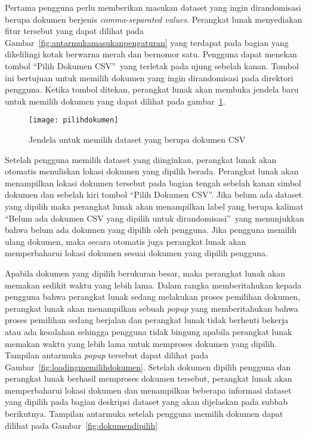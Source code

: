 Pertama pengguna perlu memberikan masukan dataset yang ingin dirandomisasi berupa dokumen berjenis \textit{comma-separated values}. Perangkat lunak menyediakan fitur tersebut yang dapat dilihat pada Gambar~\ref{fig:antarmukamasukanpengaturan} yang terdapat pada bagian yang dikelilingi kotak berwarna merah dan bernomor satu. Pengguna dapat menekan tombol \textquotedblleft Pilih Dokumen CSV\textquotedblright~yang terletak pada ujung sebelah kanan. Tombol ini bertujuan untuk memilih dokumen yang ingin dirandomisasi pada direktori pengguna. Ketika tombol ditekan, perangkat lunak akan membuka jendela baru untuk memilih dokumen yang dapat dilihat pada gambar~\ref{fig:pilihdokumen}.

\begin{figure}
	\centering
	\texttt{[image: pilihdokumen]}
	\caption{Jendela untuk memilih dataset yang berupa dokumen CSV}
	\label{fig:pilihdokumen}
\end{figure}

Setelah pengguna memilih dataset yang diinginkan, perangkat lunak akan otomatis menuliskan lokasi dokumen yang dipilih berada. Perangkat lunak akan menampilkan lokasi dokumen tersebut pada bagian tengah sebelah kanan simbol dokumen dan sebelah kiri tombol \textquotedblleft Pilih Dokumen CSV\textquotedblright. Jika belum ada dataset yang dipilih maka perangkat lunak akan menampilkan label yang berupa kalimat \textquotedblleft Belum ada dokumen CSV yang dipilih untuk dirandomisasi\textquotedblright~yang menunjukkan bahwa belum ada dokumen yang dipilih oleh pengguna. Jika pengguna memilih ulang dokumen, maka secara otomatis juga perangkat lunak akan memperbaharui lokasi dokumen sesuai dokumen yang dipilih pengguna.

Apabila dokumen yang dipilih berukuran besar, maka perangkat lunak akan memakan sedikit waktu yang lebih lama. Dalam rangka memberitahukan kepada pengguna bahwa perangkat lunak sedang melakukan proses pemilihan dokumen, perangkat lunak akan menampilkan sebuah \textit{popup} yang memberitahukan bahwa proses pemilihan sedang berjalan dan perangkat lunak tidak berhenti bekerja atau ada kesalahan sehingga pengguna tidak bingung apabila perangkat lunak memakan waktu yang lebih lama untuk memproses dokumen yang dipilih. Tampilan antarmuka \textit{popup} tersebut dapat dilihat pada Gambar~\ref{fig:loadingmemilihdokumen}. Setelah dokumen dipilih pengguna dan perangkat lunak berhasil memproses dokumen tersebut, perangkat lunak akan memperbaharui lokasi dokumen dan menampilkan beberapa informasi dataset yang dipilih pada bagian deskripsi dataset yang akan dijelaskan pada subbab berikutnya. Tampilan antarmuka setelah pengguna memilih dokumen dapat dilihat pada Gambar~\ref{fig:dokumendipilih}

